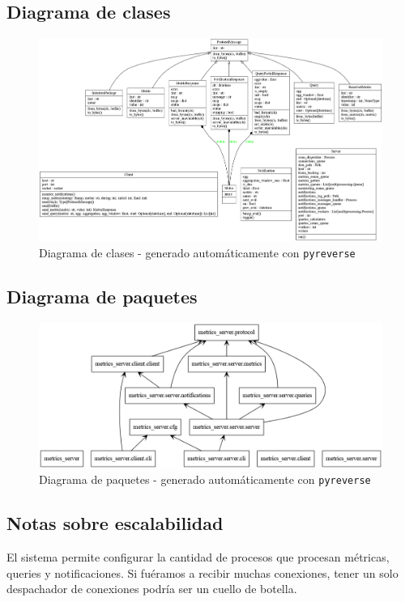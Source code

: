 \documentclass[a4paper,oneside]{article}
\begin{document}
\subsection{Diagrama de clases}
\begin{figure}[H]
\centering
\includegraphics[width=\textwidth]{images/classes.png}
\caption{Diagrama de clases - generado automáticamente con \texttt{pyreverse}}
\end{figure}

\subsection{Diagrama de paquetes}
\begin{figure}[H]
\centering
\includegraphics[width=\textwidth]{images/packages.png}
\caption{Diagrama de paquetes - generado automáticamente con \texttt{pyreverse}}
\end{figure}

\subsection{Notas sobre escalabilidad}
El sistema permite configurar la cantidad de procesos que procesan métricas, queries y notificaciones. Si fuéramos a recibir muchas conexiones, tener un solo despachador de conexiones podría ser un cuello de botella.
\end{document}
